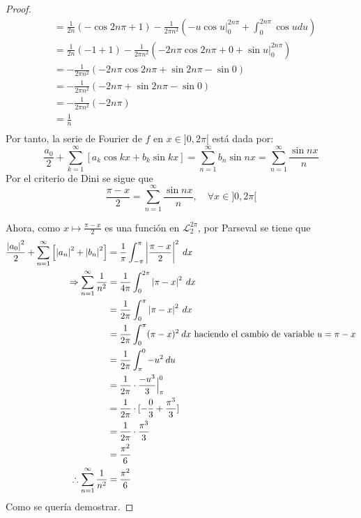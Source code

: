 \documentclass[12pt]{report}
\theoremstyle{largebreak}
\newcommand\abs[1]{\ensuremath{\left|#1\right|}}
\begin{document}
\begin{proof}
\begin{equation*}
\begin{split}
                &=\frac{1}{2n}(-\cos 2n\pi+1)-\frac{1}{2\pi n^2}\left(-u\cos u\Big|_{0}^{2n\pi}+\int_{0}^{2n\pi}\cos udu \right) \\
                &=\frac{1}{2n}(-1+1)-\frac{1}{2\pi n^2}\left(-2n\pi\cos 2n\pi+0+\sin u\Big|_{0}^{2n\pi} \right) \\
                &=-\frac{1}{2\pi n^2}\left(-2n\pi\cos 2n\pi+\sin 2n\pi-\sin 0 \right) \\
                &=-\frac{1}{2\pi n^2}\left(-2n\pi+\sin 2n\pi-\sin 0 \right) \\
                &=-\frac{1}{2\pi n^2}\left(-2n\pi \right) \\
                &=\frac{1}{n}\\
            \end{split}
        \end{equation*}
        Por tanto, la serie de Fourier de $f$ en $x\in]0,2\pi[$ está dada por:
        \begin{equation*}
            \frac{a_0}{2}+\sum_{ k=1}^\infty\left[a_k\cos kx+b_k\sin kx \right]=\sum_{ n=1}^\infty b_n\sin nx=\sum_{ n=1}^\infty\frac{\sin nx}{n}
        \end{equation*}
        Por el criterio de Dini se sigue que
        \begin{equation*}
            \frac{\pi-x}{2}=\sum_{ n=1}^\infty\frac{\sin nx}{n},\quad\forall x\in]0,2\pi[
        \end{equation*}

        Ahora, como $x\mapsto\frac{\pi-x}{2}$ es una función en $\mathcal{L}_2^{2\pi}$, por Parseval se tiene que
        \begin{equation*}
            \begin{split}
                \frac{\abs{a_0}^2}{2}+\sum_{n=1}^\infty\left[\abs{a_n}^2+\abs{b_n}^2 \right]&=\frac{1}{\pi}\int_{-\pi}^{\pi}\abs{\frac{\pi-x}{2}}^2\:dx\\
                \Rightarrow \sum_{ n=1}^\infty\frac{1}{n^2}&=\frac{1}{4\pi}\int_0^{2\pi}\abs{\pi-x}^2\:dx\\
                &=\frac{1}{2\pi}\int_0^{\pi}\abs{\pi-x}^2\:dx\\
                &=\frac{1}{2\pi}\int_0^{\pi}(\pi-x)^2\:dx\textup{ haciendo el cambio de variable }u=\pi-x \\
                &=\frac{1}{2\pi}\int_{\pi}^{0}-u^2\:du\\
                &=\frac{1}{2\pi}\cdot\frac{-u^3}{3}\Big|_{\pi}^{0}\\
                &=\frac{1}{2\pi}\cdot[-\frac{0}{3}+\frac{\pi^3}{3} ]\\
                &=\frac{1}{2\pi}\cdot\frac{\pi^3}{3}\\
                &=\frac{\pi^2}{6}\\
                \therefore \sum_{ n=1}^\infty\frac{1}{n^2}&=\frac{\pi^2}{6}\\
            \end{split}
        \end{equation*}
        Como se quería demostrar.
    \end{proof}
\end{document}
